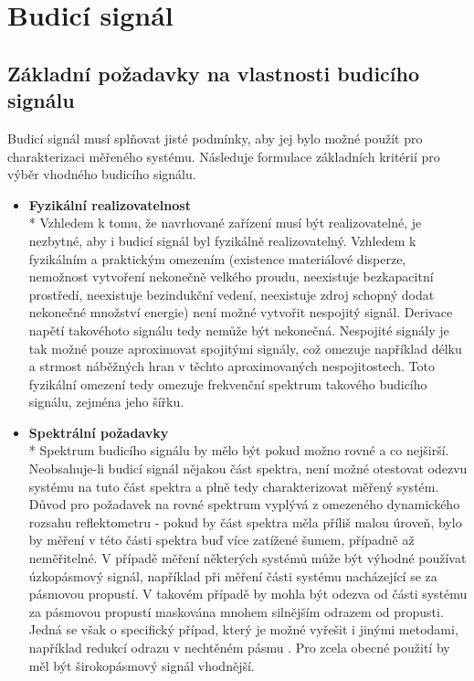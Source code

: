 \chapter{Budicí signál}

\section{Základní požadavky na vlastnosti budicího signálu}
Budicí signál musí splňovat jisté podmínky, aby jej bylo možné použít pro charakterizaci měřeného systému. Následuje formulace základních kritérií pro výběr vhodného budicího signálu.

\begin{itemize}
	\item
	\textbf{Fyzikální realizovatelnost}\\*
	Vzhledem k tomu, že navrhované zařízení musí být realizovatelné, je nezbytné, aby i budicí signál byl fyzikálně realizovatelný. Vzhledem k fyzikálním a praktickým omezením (existence materiálové disperze, nemožnost vytvoření nekonečně velkého proudu, neexistuje bezkapacitní prostředí, neexistuje bezindukční vedení, neexistuje zdroj schopný dodat nekonečné množství energie) není možné vytvořit nespojitý signál. Derivace napětí takovéhoto signálu tedy nemůže být nekonečná. Nespojité signály je tak možné pouze aproximovat spojitými signály, což omezuje například délku a strmost náběžných hran v těchto aproximovaných nespojitostech. Toto fyzikální omezení tedy omezuje frekvenční spektrum takového budicího signálu, zejména jeho šířku.
	
	\item
	\textbf{Spektrální požadavky}\\*	
	Spektrum budicího signálu by mělo být pokud možno rovné a co nejširší. Neobsahuje-li budicí signál nějakou část spektra, není možné otestovat odezvu systému na tuto část spektra a plně tedy charakterizovat měřený systém. Důvod pro požadavek na rovné spektrum vyplývá z omezeného dynamického rozsahu reflektometru - pokud by část spektra měla příliš malou úroveň, bylo by měření v této části spektra buď více zatížené šumem, případně až neměřitelné. V případě měření některých systémů může být výhodné používat úzkopásmový signál, například při měření části systému nacházející se za pásmovou propustí. V takovém případě by mohla být odezva od části systému za pásmovou propustí maskována mnohem silnějším odrazem od propusti. Jedná se však o specifický případ, který je možné vyřešit i jinými metodami, například redukcí odrazu v nechtěném pásmu \cite{sincgausstdr}. Pro zcela obecné použití by měl být širokopásmový signál vhodnější.
	

\end{itemize}
